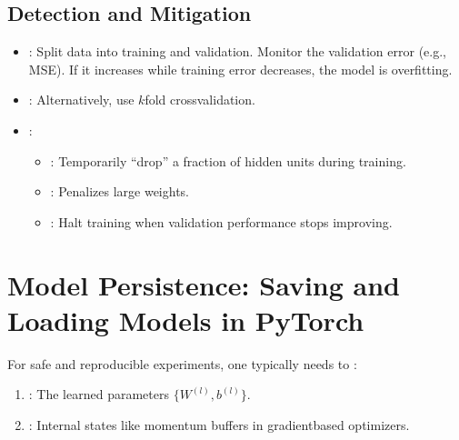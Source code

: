 \documentclass[letterpaper,10pt,english]{jupyterBook}
\begin{document}
\subsection{Detection and Mitigation}
\label{\detokenize{04:detection-and-mitigation}}\begin{itemize}
\item {} 
\sphinxAtStartPar
{}: Split data into training and validation. Monitor the validation error (e.g., MSE). If it increases while training error decreases, the model is overfitting.

\item {} 
\sphinxAtStartPar
{}: Alternatively, use \(k\)\sphinxhyphen{}fold cross\sphinxhyphen{}validation.

\item {} 
\sphinxAtStartPar
{}:
\begin{itemize}
\item {} 
\sphinxAtStartPar
{}: Temporarily “drop” a fraction of hidden units during training.

\item {} 
\sphinxAtStartPar
{}: Penalizes large weights.

\item {} 
\sphinxAtStartPar
{}: Halt training when validation performance stops improving.

\end{itemize}

\end{itemize}


\section{Model Persistence: Saving and Loading Models in PyTorch}
\label{\detokenize{04:model-persistence-saving-and-loading-models-in-pytorch}}
\sphinxAtStartPar
For safe and reproducible experiments, one typically needs to :
\begin{enumerate}
%
\item {} 
\sphinxAtStartPar
{}: The learned parameters \(\{W^{(l)},b^{(l)}\}\).

\item {} 
\sphinxAtStartPar
{}: Internal states like momentum buffers in gradient\sphinxhyphen{}based optimizers.

\end{enumerate}
\end{document}
